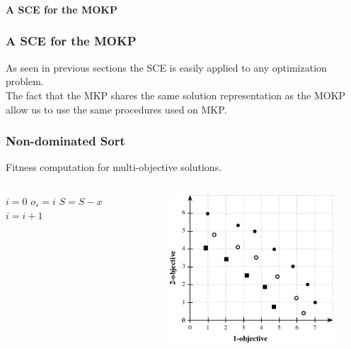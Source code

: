 %
\begin{frame}
\frametitle{}
\begin{center}
  \textbf{\Large A SCE for the MOKP}
\end{center}
\end{frame}

%
\begin{frame}
\frametitle{A SCE for the MOKP}
As seen in previous sections
the SCE is easily applied to any optimization problem.
\\ \bigskip \pause
The fact that the MKP shares the same solution representation
as the MOKP allow us to use the same procedures
used on MKP.
\end{frame}

%
\begin{frame}
\frametitle{Non-dominated Sort}
Fitness computation for multi-objective solutions.
\medskip
\begin{columns}
\begin{column}{0.5\textwidth}  %
  \begin{algorithmic}[1]
      \State $i = 0$
            \State $o_s = i$
            \State $S = S - {x}$
          \EndIf
        \EndFor
        \State $i = i+1$
      \EndWhile
    \EndFunction
  \end{algorithmic}
\end{column}
\begin{column}{0.5\textwidth}
  \begin{figure}
    \centering
    \includegraphics{img/pareto-sort}
  \end{figure}
\end{column}
\end{columns}
\end{frame}

